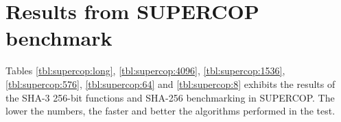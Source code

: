 \documentclass[english,12pt,a4paper]{book}
\begin{document}



\chapter{Results from SUPERCOP benchmark}
\label{app:supercop:bench}

Tables \ref{tbl:supercop:long}, \ref{tbl:supercop:4096},
\ref{tbl:supercop:1536}, \ref{tbl:supercop:576}, \ref{tbl:supercop:64} and
\ref{tbl:supercop:8} exhibits the results of the \ac{SHA}-3 256-bit functions
and \ac{SHA}-256 benchmarking in \ac{SUPERCOP}. The lower the numbers, the
faster and better the algorithms performed in the test.







\end{document}
